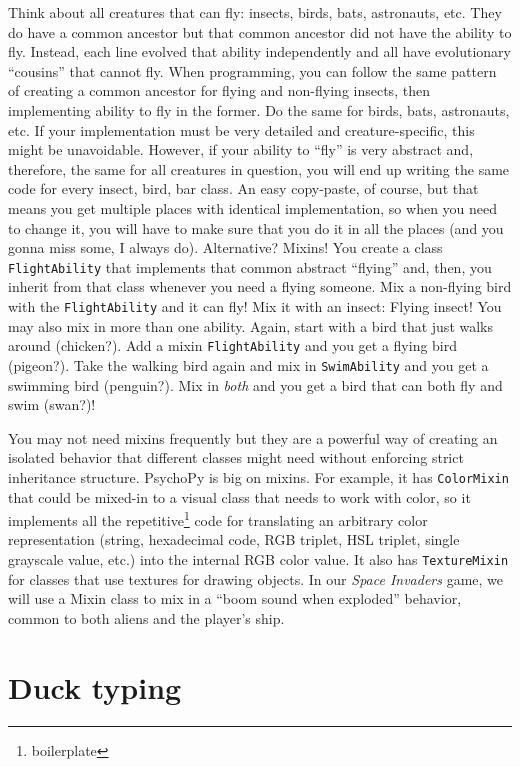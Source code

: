 \documentclass[
]{book}
\begin{document}
Think about all creatures that can fly: insects, birds, bats, astronauts, etc. They do have a common ancestor but that common ancestor did not have the ability to fly. Instead, each line evolved that ability independently and all have evolutionary ``cousins'' that cannot fly. When programming, you can follow the same pattern of creating a common ancestor for flying and non-flying insects, then implementing ability to fly in the former. Do the same for birds, bats, astronauts, etc. If your implementation must be very detailed and creature-specific, this might be unavoidable. However, if your ability to ``fly'' is very abstract and, therefore, the same for all creatures in question, you will end up writing the same code for every insect, bird, bar class. An easy copy-paste, of course, but that means you get multiple places with identical implementation, so when you need to change it, you will have to make sure that you do it in all the places (and you gonna miss some, I always do). Alternative? Mixins! You create a class \texttt{FlightAbility} that implements that common abstract ``flying'' and, then, you inherit from that class whenever you need a flying someone. Mix a non-flying bird with the \texttt{FlightAbility} and it can fly! Mix it with an insect: Flying insect! You may also mix in more than one ability. Again, start with a bird that just walks around (chicken?). Add a mixin \texttt{FlightAbility} and you get a flying bird (pigeon?). Take the walking bird again and mix in \texttt{SwimAbility} and you get a swimming bird (penguin?). Mix in \emph{both} and you get a bird that can both fly and swim (swan?)!

You may not need mixins frequently but they are a powerful way of creating an isolated behavior that different classes might need without enforcing strict inheritance structure. PsychoPy is big on mixins. For example, it has \texttt{ColorMixin} that could be mixed-in to a visual class that needs to work with color, so it implements all the repetitive\footnote{boilerplate} code for translating an arbitrary color representation (string, hexadecimal code, RGB triplet, HSL triplet, single grayscale value, etc.) into the internal RGB color value. It also has \texttt{TextureMixin} for classes that use textures for drawing objects. In our \emph{Space Invaders} game, we will use a Mixin class to mix in a ``boom sound when exploded'' behavior, common to both aliens and the player's ship.

\hypertarget{duck-typing}{%
\section{Duck typing}\label{duck-typing}}
\end{document}
